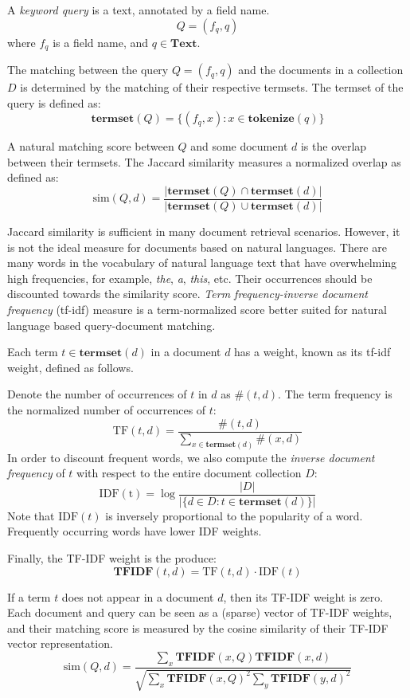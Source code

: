 A {\em keyword query} is a text, annotated by a field name.
$$Q = (f_q, q)$$
where $f_q$ is a field name, and $q\in\mathbf{Text}$.

The matching between the query $Q = (f_q, q)$ and the documents in a collection $D$ is determined by the matching of their respective termsets.  The termset of the query is defined as:
$$
\mathbf{termset}(Q) = \{(f_q, x): x\in\mathbf{tokenize}(q)\}
$$

\newcommand{\Termset}{\mathbf{termset}}
\newcommand{\TFIDF}{\mathbf{TFIDF}}
A natural matching score between $Q$ and some document $d$ is the overlap between their termsets.  The Jaccard similarity measures a normalized overlap as defined as:
$$
\mathrm{sim}(Q, d) = \frac{|\Termset(Q)\cap\Termset(d)|}{|\Termset(Q)\cup\Termset(d)|}
$$

Jaccard similarity is sufficient in many document retrieval scenarios. However, it is not the ideal measure for documents based on natural languages. There are many words in the vocabulary of natural language text that have overwhelming high frequencies, for example, {\em the}, {\em a}, {\em this}, etc.  Their occurrences should be discounted towards the similarity score.  {\em Term frequency-inverse document frequency} (tf-idf) measure is a term-normalized score better suited for natural language based query-document matching.

Each term $t\in\Termset(d)$ in a document $d$ has a weight, known as its tf-idf weight, defined as follows.

Denote the number of occurrences of $t$ in $d$ as $\#(t,d)$.  The term frequency is the normalized number of occurrences of $t$:
$$
\mathrm{TF}(t, d) = \frac{\#(t, d)}{\sum_{x\in\Termset(d)}\#(x, d)}
$$
In order to discount frequent words, we also compute the {\em inverse document frequency} of $t$ with respect to the entire document collection $D$:
$$
\mathrm{IDF(t)} = \log \frac{|D|}{|\{d\in D: t\in\Termset(d)\}|}
$$
Note that $\mathrm{IDF}(t)$ is inversely proportional to the popularity of a word.  Frequently occurring words have lower IDF weights.

Finally, the TF-IDF weight is the produce:
$$
\TFIDF(t, d) = \mathrm{TF}(t, d)\cdot \mathrm{IDF}(t)
$$

If a term $t$ does not appear in a document $d$, then its TF-IDF weight is zero.  Each document and query can be seen as a (sparse) vector of TF-IDF weights, and their matching score is measured by the cosine similarity of their TF-IDF vector representation.
\begin{equation}
\mathrm{sim}(Q, d) = \frac{\sum_{x}\TFIDF(x, Q) \TFIDF(x,d)}{
\sqrt{\sum_{x}\TFIDF(x,Q)^2 \sum_{y}\TFIDF(y,d)^2}
}
\label{eq:tfidf-sim}
\end{equation}

